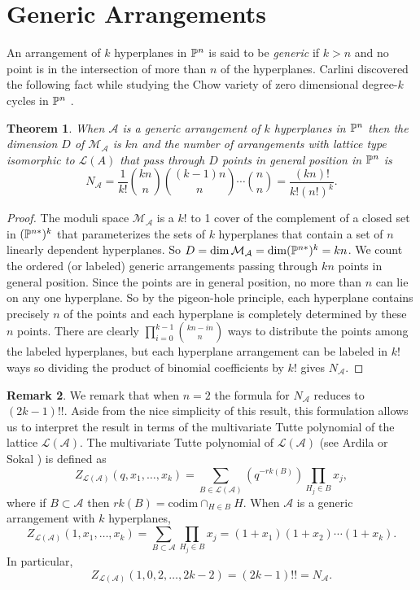 \documentclass[12pt]{article}
\theoremstyle{plain}
\newtheorem{theorem}{Theorem}
\theoremstyle{definition}
\newtheorem{remark}[theorem]{Remark}
\newcommand{\A}{\mathcal{A}}
\newcommand{\M}{\mathcal{M}}
\newcommand{\N}{N}
\renewcommand{\L}{\mathcal{L}}
\newcommand{\MLA}{\M_{\A}}
\renewcommand{\P}{\ensuremath \mathbb{P}}
\newcommand{\codim}{\text{codim}}
\begin{document}
\section{Generic Arrangements} \label{section:generic}

An arrangement of $k$ hyperplanes in $\P^n$ is said to be {\em generic} if
$k > n$ and no point is in the intersection of more than $n$ of the
hyperplanes. Carlini discovered the following fact while studying the
Chow variety of zero dimensional degree-$k$ cycles in $\P^n$
\cite[Proposition 3.4]{Carlini}. 

\begin{theorem}\label{generics} When $\A$ is a generic arrangement of $k$ hyperplanes
  in $\P^n$ then the dimension $D$ of $\MLA$ is $kn$ and the number of
  arrangements with lattice type isomorphic to $\L(A)$ that pass through
  $D$ points in general position in $\P^n$ is $$ \N_\A = \frac{1}{k!}
  \binom{kn}{n} \binom{(k-1)n}{n} \cdots \binom{n}{n} =
  \frac{(kn)!}{k!(n!)^k}.$$ 
\end{theorem}

\begin{proof}
  The moduli space $\MLA$ is a $k!$ to 1 cover of the complement of a
  closed set in $(\P^{n*})^k$ that parameterizes the sets of $k$
  hyperplanes that contain a set of $n$ linearly dependent
  hyperplanes. So $D=\dim \MLA = \dim (\P^{n*})^k = kn$. We count the
  ordered (or labeled) generic arrangements passing through $kn$
  points in general position. Since the points are in general
  position, no more than $n$ can lie on any one hyperplane. So by the
  pigeon-hole principle, each hyperplane contains precisely $n$ of the
  points and each hyperplane is completely determined by these $n$
  points. There are clearly $\prod_{i=0}^{k-1} \binom{kn-in}{n}$
  ways to distribute the points among the labeled hyperplanes, but each
  hyperplane arrangement can be labeled in $k!$ ways so dividing the
  product of binomial coefficients by $k!$ gives $\N_\A$.  
\end{proof}

\begin{remark}
We remark that when $n=2$ the formula for $\N_\A$ reduces to
$(2k-1)!!$. Aside from the nice simplicity of this result, this
formulation allows us to interpret the result in terms of the
multivariate Tutte polynomial of the lattice $\L(\A)$. The
multivariate Tutte polynomial of $\L(\A)$ (see Ardila \cite{Ardila} or Sokal
\cite{Sokal}) is defined as 
$$ Z_{\L(\A)}(q,x_1,\ldots,x_k) = \sum_{B \in \L(\A)} (q^{-rk(B)})
\prod_{H_j \in B} x_j, $$ where if $B \subset
\A$ then $rk(B) = \codim \cap_{H\in B} H.$ When $\A$ is
a generic arrangement with $k$ hyperplanes, $$Z_{\L(\A)}(1,x_1, \ldots,
x_k) = \sum_{B \subset \A} \prod_{H_j \in B} x_j =
(1+x_1)(1+x_2)\cdots (1+x_k).$$ In
particular, $$ Z_{\L(\A)}(1,0,2,\ldots,2k-2) = (2k-1)!! = \N_\A. $$ 
\end{remark}
\end{document}

